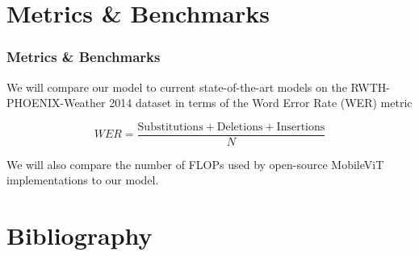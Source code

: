 \documentclass[english, xcolor={table}]{beamer}
\begin{document}
\section{Metrics \& Benchmarks}
\begin{frame}
  \frametitle{Metrics \& Benchmarks}

  We will compare our model to current state-of-the-art models on the RWTH-PHOENIX-Weather 2014 dataset in terms of the Word Error Rate (WER) metric 
  
  \[WER = \frac{\text{Substitutions}+\text{Deletions}+\text{Insertions}}{N}\]

  We will also compare the number of FLOPs used by open-source MobileViT implementations to our model.
\end{frame}

\section{Bibliography}



\end{document}
